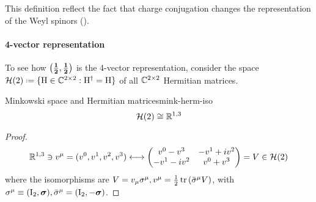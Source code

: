 This definition reflect the fact that charge conjugation changes the representation of the Weyl spinors ().

\paragraph{4-vector representation}

To see how $ \mathbf{\left( \frac{1}{2},\frac{1}{2} \right)} $ is the 4-vector representation, consider the space $ \mathcal{H}(2) \defeq \{\tens{H} \in \C^{2 \times 2} : \tens{H}\dg = \tens{H}\} $ of all $ \mathbb{C}^{2 \times 2} $ Hermitian matrices.

\begin{lemma}[before upper = {\tcbtitle}]{Minkowski space and Hermitian matrices}{mink-herm-iso}
  \begin{equation}
    \mathcal{H}(2) \cong \mathbb{R}^{1,3}
  \end{equation}
\end{lemma}

\begin{proofbox}
  \begin{proof}
    \begin{equation*}
      \mathbb{R}^{1,3} \ni v^\mu = (v^0,v^1,v^2,v^3) \longleftrightarrow
      \begin{pmatrix}
        v^0 - v^3 & -v^1 + i v^2 \\
        -v^1 - i v^2 & v^0 + v^3
      \end{pmatrix}
      = V \in \mathcal{H}(2)
    \end{equation*}
    where the isomorphisms are $ V = v_\mu \sigma^\mu , v^\mu = \frac{1}{2} \operatorname{tr} \left( \bar{\sigma}^\mu V \right) $, with $ \sigma^\mu \equiv (\mathrm{I}_2,\boldsymbol{\sigma}) , \bar{\sigma}^\mu = (\mathrm{I}_2,-\boldsymbol{\sigma}) $.
  \end{proof}
\end{proofbox}

